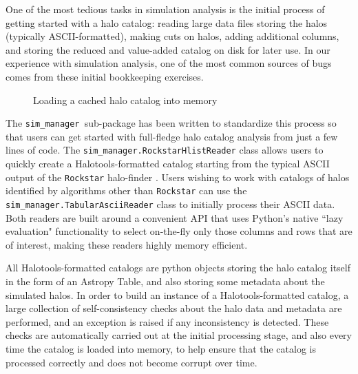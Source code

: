 \documentclass[twocolumn, tighten]{aastex6}
\newcommand{\sims}{{\tt sim\_manager }}
\begin{document}
One of the most tedious tasks in simulation analysis is the initial process of getting started with a halo catalog: reading large data files storing the halos (typically ASCII-formatted), making cuts on halos, adding additional columns, and storing the reduced and value-added catalog on disk for later use. In our experience with simulation analysis, one of the most common sources of bugs comes from these initial bookkeeping exercises. 

\begin{figure}
\center
\caption{Loading a cached halo catalog into memory\label{code:cachedsim}}
\vspace{0.1in}
\end{figure}

The \sims sub-package has been written to standardize this process so that users can get started with full-fledge halo catalog analysis from just a few lines of code. The {\tt sim\_manager.RockstarHlistReader} class allows users to quickly create a Halotools-formatted catalog starting from the typical ASCII output of the {\tt Rockstar} halo-finder \citep{behroozi_rockstar11, rockstar_trees}. Users wishing to work with catalogs of halos identified by algorithms other than {\tt Rockstar} can use the {\tt sim\_manager.TabularAsciiReader} class to initially process their ASCII data. Both readers are built around a convenient API that uses Python's native ``lazy evaluation" functionality to select on-the-fly only those columns and rows that are of interest, making these readers highly memory efficient. 

All Halotools-formatted catalogs are python objects storing the halo catalog itself in the form of an Astropy Table, and also storing some metadata about the simulated halos. In order to build an instance of a Halotools-formatted catalog, a large collection of self-consistency checks about the halo data and metadata are performed, and an exception is raised if any inconsistency is detected. These checks are automatically carried out at the initial processing stage, and also every time the catalog is loaded into memory, to help ensure that the catalog is processed correctly and does not become corrupt over time. 
\end{document}
